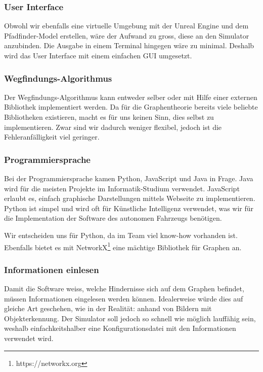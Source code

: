 \documentclass[../main.tex]{subfiles}
\begin{document}
\subsubsection{User Interface}

Obwohl wir ebenfalls eine virtuelle Umgebung mit der Unreal Engine und dem Pfadfinder-Model erstellen, wäre der Aufwand zu gross, diese an den Simulator anzubinden. Die Ausgabe in einem Terminal hingegen wäre zu minimal. Deshalb wird das User Interface mit einem einfachen GUI umgesetzt. 

\subsubsection{Wegfindungs-Algorithmus}

Der Wegfindungs-Algorithmus kann entweder selber oder mit Hilfe einer externen Bibliothek 
implementiert werden. Da für die Graphentheorie bereits viele beliebte Bibliotheken existieren, macht es für uns keinen Sinn, dies selbst zu implementieren. Zwar sind wir dadurch weniger flexibel, jedoch ist die Fehleranfälligkeit viel geringer.  

\subsubsection{Programmiersprache}

Bei der Programmiersprache kamen Python, JavaScript und Java in Frage.
Java wird für die meisten Projekte im Informatik-Studium verwendet. JavaScript erlaubt es, einfach graphische Darstellungen mittels Webseite zu implementieren. Python ist simpel und wird oft für Künstliche Intelligenz verwendet, was wir für die Implementation der Software des autonomen Fahrzeugs benötigen. 

Wir entscheiden uns für Python, da im Team viel know-how vorhanden ist. Ebenfalls bietet es mit NetworkX\footnote{https://networkx.org} eine mächtige Bibliothek für Graphen an.

\subsubsection{Informationen einlesen}

Damit die Software weiss, welche Hindernisse sich auf dem Graphen befindet, müssen Informationen eingelesen werden können. Idealerweise würde dies auf gleiche Art geschehen, wie in der Realität: anhand von Bildern mit Objekterkennung. Der Simulator soll jedoch so schnell wie möglich lauffähig sein, weshalb einfachkeitshalber eine Konfigurationsdatei mit den Informationen verwendet wird.
\end{document}
